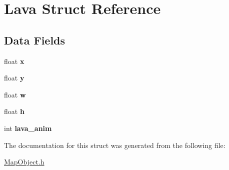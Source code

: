 \hypertarget{struct_lava}{}\section{Lava Struct Reference}
\label{struct_lava}
\subsection*{Data Fields}
\begin{DoxyCompactItemize}
\item 
\hypertarget{struct_lava_ad0da36b2558901e21e7a30f6c227a45e}{}float {\bfseries x}\label{struct_lava_ad0da36b2558901e21e7a30f6c227a45e}

\item 
\hypertarget{struct_lava_aa4f0d3eebc3c443f9be81bf48561a217}{}float {\bfseries y}\label{struct_lava_aa4f0d3eebc3c443f9be81bf48561a217}

\item 
\hypertarget{struct_lava_a56eca241e2896b9f57a79589e76fd24b}{}float {\bfseries w}\label{struct_lava_a56eca241e2896b9f57a79589e76fd24b}

\item 
\hypertarget{struct_lava_a85f2f1bd58b3b44ffdf3881823393959}{}float {\bfseries h}\label{struct_lava_a85f2f1bd58b3b44ffdf3881823393959}

\item 
\hypertarget{struct_lava_ae0e060cd5cf34f9001c9f27c83d9ef95}{}int {\bfseries lava\+\_\+anim}\label{struct_lava_ae0e060cd5cf34f9001c9f27c83d9ef95}

\end{DoxyCompactItemize}


The documentation for this struct was generated from the following file\+:\begin{DoxyCompactItemize}
\item 
\hyperlink{_map_object_8h}{Map\+Object.\+h}\end{DoxyCompactItemize}
